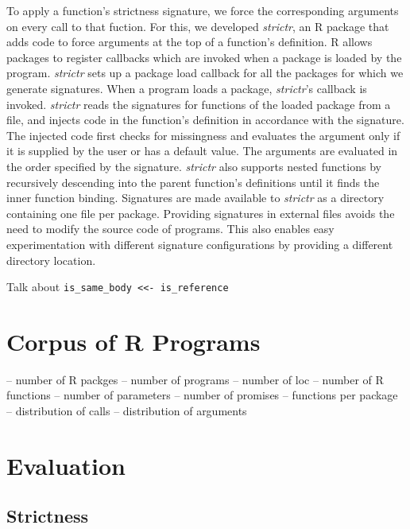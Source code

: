\documentclass[screen,acmsmall]{acmart}
\newcommand{\code}[1]{\lstinline[style=R]|#1|\xspace}
\begin{document}
To apply a function's strictness signature, we force the corresponding
arguments on every call to that fuction. For this, we developed \emph{strictr},
an R package that adds code to force arguments at the top of a function's
definition. R allows packages to register callbacks which are invoked when a
package is loaded by the program. \emph{strictr} sets up a package load callback
for all the packages for which we generate signatures. When a program loads a
package, \emph{strictr}'s callback is invoked. \emph{strictr} reads the
signatures for functions of the loaded package from a file, and injects code in
the function's definition in accordance with the signature. The injected code
first checks for missingness and evaluates the argument only if it is supplied
by the user or has a default value. The arguments are evaluated in the order
specified by the signature. \emph{strictr} also supports nested functions by
recursively descending into the parent function's definitions until it finds the
inner function binding. Signatures are made available to \emph{strictr} as a
directory containing one file per package. Providing signatures in external
files avoids the need to modify the source code of programs. This also enables
easy experimentation with different signature configurations by providing a
different directory location.

Talk about  \code{is_same_body <<- is_reference}


\section{Corpus of R Programs}

-- number of R packges
-- number of programs
-- number of loc
-- number of R functions
-- number of parameters
-- number of promises
-- functions per package
-- distribution of calls
-- distribution of arguments

\section{Evaluation}

\subsection{Strictness}
\end{document}
